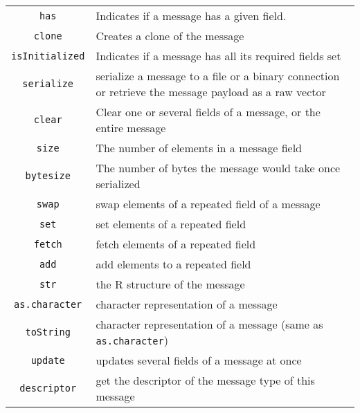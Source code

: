 \documentclass[10pt,twocolumn,a4paper]{article}
\begin{document}
\begin{center}
\begin{small}
\begin{tabular}{cp{7cm}}
\hline
\texttt{has} & Indicates if a message has a given field.   \\
\texttt{clone} & Creates a clone of the message \\
\texttt{isInitialized}  & Indicates if a message has all its required fields set\\
\texttt{serialize} & serialize a message to a file or a binary connection or retrieve the message payload as a raw vector\\
\texttt{clear}  & Clear one or several fields of a message, or the entire message\\
\texttt{size}  & The number of elements in a message field\\
\texttt{bytesize}  & The number of bytes the message would take once serialized\\
\hline
\texttt{swap}  & swap elements of a repeated field of a message\\
\texttt{set}  & set elements of a repeated field\\
\texttt{fetch}  & fetch elements of a repeated field\\
\texttt{add}  & add elements to a repeated field \\
\hline
\texttt{str}  & the R structure of the message\\
\texttt{as.character}  & character representation of a message\\
\texttt{toString}  & character representation of a message (same as \texttt{as.character}) \\
\texttt{update}  & updates several fields of a message at once\\
\texttt{descriptor} & get the descriptor of the message type of this message\\
\hline
\end{tabular}
\end{small}
\end{center}
\end{document}

